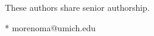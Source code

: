 \begin{flushleft}
\ddag These authors share senior authorship.




* morenoma@umich.edu

\end{flushleft}
